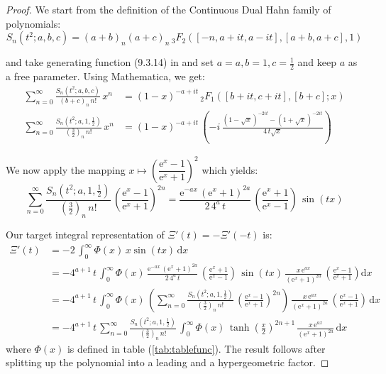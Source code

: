 \documentclass[a4paper,11pt,twoside]{amsart}
\newcommand{\verifiedeq}{=}
\newcommand{\defeq}{=}
\newcommand{\verifiedeq}{\stackrel{\checkmark}{=}}
\newcommand{\defeq}{\stackrel{\scriptscriptstyle \textnormal{def}}{=}}
\begin{document}
\begin{proof}
We start from the definition of the Continuous Dual Hahn family of polynomials:
\begin{equation}
 S_n(t^2;a,b,c) \defeq (a+b)_n(a+c)_n\, {}_3F_2([-n,a+it, a- it], [a+b, a+c], 1) 
\end{equation}

and take generating function (9.3.14) in \cite{koe} and set $a=a,b=1,c=\frac12$ and keep $a$ as a free parameter. Using Mathematica, we get:
\begin{align}
 \sum_{n=0}^\infty \frac{S_n(t^2;a,b,c)}{(b+c)_n\,n!}\, x^n &\verifiedeq (1-x)^{-a+it}\,{}_2F_1\left([b+it, c+it],[b+c] ;x\right) \\
\sum_{n=0}^\infty \frac{S_n\left(t^2;a,1,\frac12\right)}{\left(\frac32\right)_n\,n!}\,x^n&\verifiedeq (1-x)^{-a+it}\,\left(-i\,\frac{(1-\sqrt{x})^{-2it}-(1+\sqrt{x})^{-2it}}{4\,t\sqrt{x}}\right)
\end{align}

We now apply the mapping $x \mapsto \left(\dfrac{\textrm{e}^{x}-1}{\textrm{e}^{x}+1}\right)^2$ which yields:
\begin{equation}
 \sum_{n=0}^\infty \frac{S_n\left(t^2;a,1,\frac12\right)}{\left(\frac32\right)_n\,n!}\, \left(\frac{\textrm{e}^{x}-1}{\textrm{e}^{x}+1}\right)^{2n} \verifiedeq \frac{\mathrm{e}^{-ax}\,(\mathrm{e}^x+1)^{2a}}{2\,4^a\,t}\,\left(\frac{\textrm{e}^{x}+1}{\textrm{e}^{x}-1}\right)\,\sin(tx)
\end{equation}

Our target integral representation of $\Xi'(t) = -\Xi'(-t)$ is:
\begin{align}
 \Xi'(t) &\verifiedeq -2\,\int_{0}^\infty \Phi(x)\,x\sin(tx)\, \mathrm{d}x \\
 &\verifiedeq -4^{a+1}\,t\, \int_{0}^\infty \Phi(x)\,\frac{\mathrm{e}^{-ax}\,(\mathrm{e}^x+1)^{2a}}{2\,4^a\,t}\,\left(\frac{\textrm{e}^{x}+1}{\textrm{e}^{x}-1}\right)\,\sin(tx)\, \frac{x\,\mathrm{e}^{ax}}{(\mathrm{e}^x+1)^{2a}}\,\left(\frac{\textrm{e}^{x}-1}{\textrm{e}^{x}+1}\right) \mathrm{d}x \\
 &\verifiedeq -4^{a+1}\,t\, \int_{0}^\infty \Phi(x)\,\left(\sum_{n=0}^\infty \frac{S_n\left(t^2;a,1,\frac12\right)}{\left(\frac32\right)_n\,n!}\, \left(\frac{\textrm{e}^{x}-1}{\textrm{e}^{x}+1}\right)^{2n}\right)\, \frac{x\,\mathrm{e}^{ax}}{(\mathrm{e}^x+1)^{2a}}\,\left(\frac{\textrm{e}^{x}-1}{\textrm{e}^{x}+1}\right)\, \mathrm{d}x \\
 &\verifiedeq -4^{a+1}\,t\,\sum_{n=0}^\infty \frac{S_n\left(t^2;a,1,\frac12\right)}{\left(\frac32\right)_n\,n!}\, \int_{0}^\infty \Phi(x)\,\tanh\left(\frac{x}{2}\right)^{2n+1}\, \frac{x\,\mathrm{e}^{ax}}{(\mathrm{e}^x+1)^{2a}}\, \mathrm{d}x
\end{align}
where $\Phi(x)$ is defined in table (\ref{tab:tablefunc}). The result follows after splitting up the polynomial into a leading and a hypergeometric factor.
\end{proof}
\end{document}
